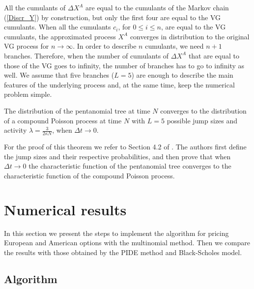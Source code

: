 \begin{Remark}
All the cumulants of $\Delta X^A$ are equal to the cumulants of the Markov chain (\ref{Discr_Y}) by construction, but only the first four are equal to the VG cumulants.
When all the cumulants $c_i$, for $0 \leq i \leq n$, are equal to the VG cumulants, the approximated process $X^A$ converges in distribution to
the original VG process for $n \to \infty$.
In order to describe $n$ cumulants, we need $n+1$ branches. Therefore, when the number of cumulants of $\Delta X^A$ that are equal to those of the VG goes to infinity, 
the number of branches has to go to infinity as well.
We assume that five branches ($L=5$) are enough to describe the main features of the underlying process and, at the same time, keep the numerical
problem simple. 
\end{Remark}

\begin{Theorem}
The distribution of the pentanomial tree at time $N$ converges to the distribution of a compound Poisson process at time $N$ with $L=5$ possible jump sizes and activity $\lambda = \frac{3}{2 \bar \kappa N}$, when $\Delta t \to 0$.   
\end{Theorem}
For the proof of this theorem  
we refer to Section 4.2 of \cite{YaPr06}. The authors first define the jump sizes and their respective probabilities, and then
prove that when $\Delta t \to 0$ the characteristic function of the pentanomial tree converges to the 
characteristic function of the compound Poisson process.



\section{Numerical results} \label{sec4_ch3}

In this section we present the steps to implement the algorithm for pricing European and American options with the multinomial method.
Then we compare the results with those obtained by the PIDE method and Black-Scholes model.

\subsection{Algorithm}

